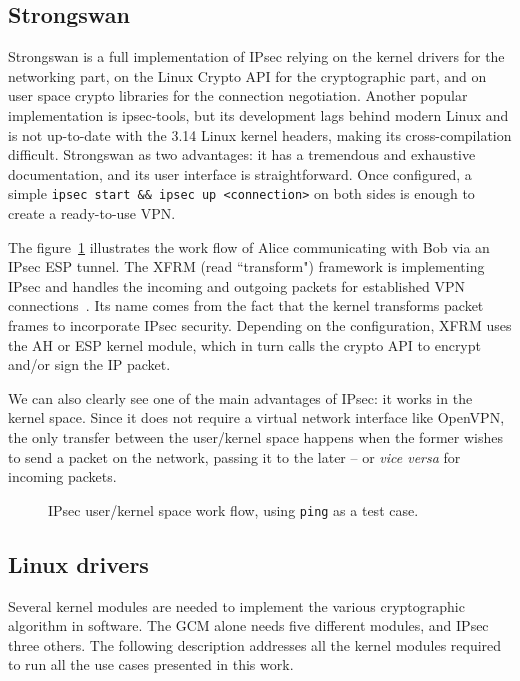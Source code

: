 \subsection{Strongswan}
Strongswan is a full implementation of IPsec relying on the kernel drivers for the networking part, on the Linux Crypto API for the cryptographic part, and on user space crypto libraries for the connection negotiation.
Another popular implementation is ipsec-tools, but its development lags behind modern Linux and is not up-to-date with the 3.14 Linux kernel headers, making its cross-compilation difficult.
Strongswan as two advantages: it has a tremendous and exhaustive documentation, and its user interface is straightforward.
Once configured, a simple \texttt{ipsec start \&\& ipsec up <connection>} on both sides is enough to create a ready-to-use VPN.

The figure~\ref{fig:ipsec-workflow} illustrates the work flow of Alice communicating with Bob via an IPsec ESP tunnel.
The XFRM (read ``transform") framework is implementing IPsec and handles the incoming and outgoing packets for established VPN connections~\cite{rosen2014}.
Its name comes from the fact that the kernel transforms packet frames to incorporate IPsec security.
Depending on the configuration, XFRM uses the AH or ESP kernel module, which in turn calls the crypto API to encrypt and/or sign the IP packet.

We can also clearly see one of the main advantages of IPsec: it works in the kernel space.
Since it does not require a virtual network interface like OpenVPN, the only transfer between the user/kernel space happens when the former wishes to send a packet on the network, passing it to the later -- or \textit{vice versa} for incoming packets.

\begin{figure}[ht]
\Large
\resizebox{\linewidth}{!}{%

}
\caption{IPsec user/kernel space work flow, using \texttt{ping} as a test case.}{}
\label{fig:ipsec-workflow}
\end{figure}


\subsection{Linux drivers}
Several kernel modules are needed to implement the various cryptographic algorithm in software.
The GCM alone needs five different modules, and IPsec three others.
The following description addresses all the kernel modules required to run all the use cases presented in this work.


